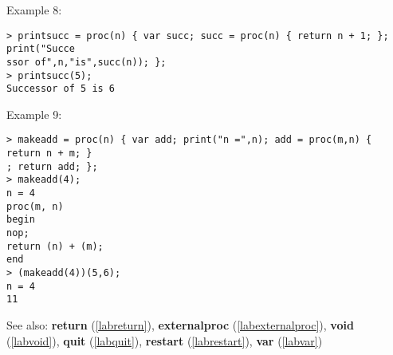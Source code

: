 \noindent Example 8: 
\begin{center}\begin{minipage}{15cm}\begin{Verbatim}[frame=single]
> printsucc = proc(n) { var succ; succ = proc(n) { return n + 1; }; print("Succe
ssor of",n,"is",succ(n)); };
> printsucc(5);
Successor of 5 is 6
\end{Verbatim}
\end{minipage}\end{center}
\noindent Example 9: 
\begin{center}\begin{minipage}{15cm}\begin{Verbatim}[frame=single]
> makeadd = proc(n) { var add; print("n =",n); add = proc(m,n) { return n + m; }
; return add; };
> makeadd(4);
n = 4
proc(m, n)
begin
nop;
return (n) + (m);
end
> (makeadd(4))(5,6);
n = 4
11
\end{Verbatim}
\end{minipage}\end{center}
See also: \textbf{return} (\ref{labreturn}), \textbf{externalproc} (\ref{labexternalproc}), \textbf{void} (\ref{labvoid}), \textbf{quit} (\ref{labquit}), \textbf{restart} (\ref{labrestart}), \textbf{var} (\ref{labvar})
